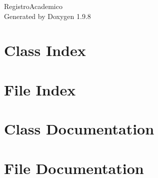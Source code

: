 \documentclass[twoside]{book}
\newcommand{\+}{\discretionary{\mbox{\scriptsize$\hookleftarrow$}}{}{}}
\newcommand{\clearemptydoublepage}{%
    \newpage{\pagestyle{empty}\cleardoublepage}%
  }
\begin{document}
  \raggedbottom
    \hypersetup{pageanchor=false,
                bookmarksnumbered=true,
                pdfencoding=unicode
               }
  \begin{titlepage}
  \vspace*{7cm}
  \begin{center}%
  {\Large Registro\+Academico}\\
  \vspace*{1cm}
  {\large Generated by Doxygen 1.9.8}\\
  \end{center}
  \end{titlepage}
  \clearemptydoublepage
  \tableofcontents
  \clearemptydoublepage
  \hypersetup{pageanchor=true}
\chapter{Class Index}

\chapter{File Index}

\chapter{Class Documentation}

\chapter{File Documentation}

  \backmatter
  \newpage
  \clearemptydoublepage
  \printindex
\end{document}
